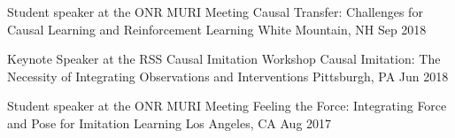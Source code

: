 


\begin{cventries}


\presentationentry
{Student speaker at the ONR MURI Meeting} %
{Causal Transfer: Challenges for Causal Learning and Reinforcement Learning} %
{White Mountain, NH} %
{Sep 2018} %
{ %
}
\vspace{-4mm}


\presentationentry
{Keynote Speaker at the RSS Causal Imitation Workshop} %
{Causal Imitation: The Necessity of Integrating Observations and Interventions} %
{Pittsburgh, PA} %
{Jun 2018} %
{ %
}
\vspace{-4mm}


\presentationentry
{Student speaker at the ONR MURI Meeting} %
{Feeling the Force: Integrating Force and Pose for Imitation Learning} %
{Los Angeles, CA} %
{Aug 2017} %
{ %
}
\vspace{-5mm}


\end{cventries}